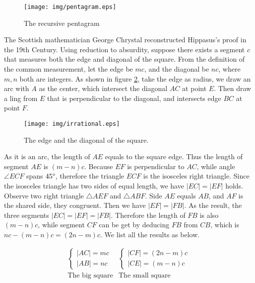 \documentclass{article}
\begin{document}
\begin{figure}[htbp]
 \centering
 \texttt{[image: img/pentagram.eps]}
 \caption{The recursive pentagram}
 \label{fig:pentagram}
\end{figure}

The Scottish mathematician George Chrystal reconstructed Hippasus's proof in the 19th Century. Using reduction to absurdity, suppose there exists a segment $c$ that measures both the edge and diagonal of the square. From the definition of the common measurement, let the edge be $mc$, and the diagonal be $nc$, where $m, n$ both are integers. As shown in figure \ref{fig:irrational}, take the edge as radius, we draw an arc with $A$ as the center, which intersect the diagonal $AC$ at point $E$. Then draw a ling from $E$ that is perpendicular to the diagonal, and intersects edge $BC$ at point $F$.

\begin{figure}[htbp]
 \centering
 \texttt{[image: img/irrational.eps]}
 \caption{The edge and the diagonal of the square.}
 \label{fig:irrational}
\end{figure}

As it is an arc, the length of $AE$ equals to the square edge. Thus the length of segment $AE$ is $(m - n)c$. Because $EF$ is perpendicular to $AC$, while angle $\angle ECF$ spans $45\degree$, therefore the triangle $ECF$ is the isosceles right triangle. Since the isosceles triangle has two sides of equal length, we have $|EC| = |EF|$ holds. Observe two right triangle $\triangle AEF$ and $\triangle ABF$. Side $AE$ equals $AB$, and $AF$ is the shared side, they congruent. Then we have $|EF| = |FB|$. As the result, the three segments $|EC| = |EF| = |FB|$. Therefore the length of $FB$ is also $(m - n)c$, while segment $CF$ can be get by deducing $FB$ from $CB$, which is $nc - (m - n)c = (2n - m)c$. We list all the results as below.

\[
\begin{array}{c|c}
\begin{cases}
|AC| = mc \\
|AB| = nc
\end{cases} &
\begin{cases}
|CF| = (2n - m)c \\
|CE| = (m - n)c
\end{cases} \\[4ex]
\text{The big square} & \text{The small square}
\end{array}
\]
\end{document}
